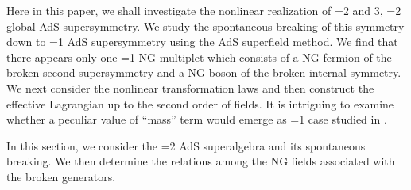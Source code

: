 \documentclass[a4paper,12pt]{article}
\begin{document}
Here in this paper, we shall investigate the nonlinear realization of
\coordHE{}=2 and 3, \coordHE{}=2 global AdS supersymmetry. We study the
spontaneous breaking of this symmetry down to \coordHE{}=1 AdS
supersymmetry using the AdS superfield method.
We find that there appears only one \coordHE{}=1 NG multiplet which
consists of a NG fermion of the broken second 
supersymmetry and a NG boson of the broken internal symmetry.
We next consider the nonlinear transformation laws and then
construct the effective Lagrangian up to the second order of
fields.
It is intriguing to examine whether a peculiar value of ``mass'' 
term would emerge as \coordHE{}=1 case studied 
in \cite{Z}.

\vspace{0.3cm}
\vspace{0.3cm}

In this section, we consider the \coordHE{}=2 AdS superalgebra and its
spontaneous breaking. We then determine the relations among the NG
fields associated with the broken generators.

\vspace{0.1cm}
\vspace{0.1cm}
\end{document}
